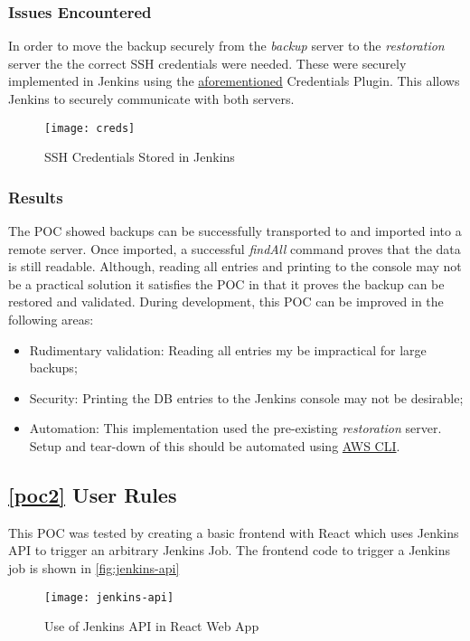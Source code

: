 	\subsubsection{Issues Encountered}
	In order to move the backup securely from the \textit{backup} server to the \textit{restoration} server the the correct SSH credentials were needed. These were securely implemented in Jenkins using the \hyperref[creds-plugin]{aforementioned} Credentials Plugin. This allows Jenkins to securely communicate with both servers.
	
	\begin{figure}[H]
		\caption{SSH Credentials Stored in Jenkins}
		\centering
		\texttt{[image: creds]}
		\label{fig:creds}
	\end{figure}

	\subsubsection{Results}
	The POC showed backups can be successfully transported to and imported into a remote server. Once imported, a successful \textit{findAll} command proves that the data is still readable. Although, reading all entries and printing to the console may not be a practical solution it satisfies the POC in that it proves the backup can be restored and validated. During development, this POC can be improved in the following areas:
	\begin{itemize}
		\item Rudimentary validation: Reading all entries my be impractical for large backups;
		\item Security: Printing the DB entries to the Jenkins console may not be desirable;
		\item Automation: This implementation used the pre-existing \textit{restoration} server. Setup and tear-down of this should be automated using \hyperref[aws-cli]{AWS CLI}.
	\end{itemize}
		
	\subsection{\ref{poc2} User Rules}
	This POC was tested by creating a basic frontend with React which uses Jenkins API to trigger an arbitrary Jenkins Job. The frontend code to trigger a Jenkins job is shown in \autoref{fig:jenkins-api}
	
	\begin{figure}[H]
		\caption{Use of Jenkins API in React Web App}
		\centering
		\texttt{[image: jenkins-api]}
		\label{fig:jenkins-api}
	\end{figure}
	
